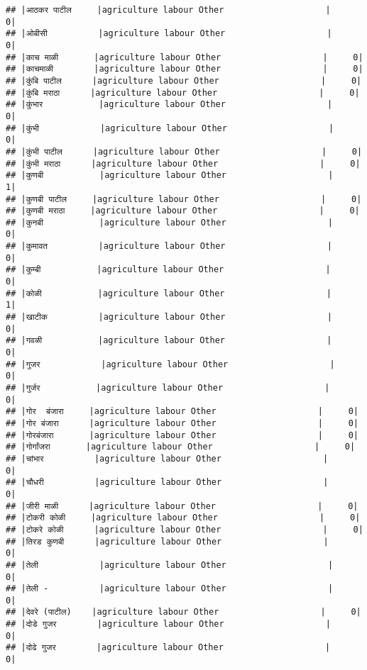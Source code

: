 \documentclass[
]{article}
\begin{document}
\begin{verbatim}
## |आठकर पाटील     |agriculture labour Other                    |     0|
## |ओबीसी          |agriculture labour Other                    |     0|
## |काच माळी       |agriculture labour Other                    |     0|
## |काचमाळी        |agriculture labour Other                    |     0|
## |कुंबि पाटील      |agriculture labour Other                    |     0|
## |कुंबि मराठा      |agriculture labour Other                    |     0|
## |कुंभार           |agriculture labour Other                    |     0|
## |कुंभी            |agriculture labour Other                    |     0|
## |कुंभी पाटील      |agriculture labour Other                    |     0|
## |कुंभी मराठा      |agriculture labour Other                    |     0|
## |कुणबी           |agriculture labour Other                    |     1|
## |कुणबी पाटील     |agriculture labour Other                    |     0|
## |कुणबी मराठा     |agriculture labour Other                    |     0|
## |कुनबी           |agriculture labour Other                    |     0|
## |कुमावत          |agriculture labour Other                    |     0|
## |कुम्बी           |agriculture labour Other                    |     0|
## |कोळी           |agriculture labour Other                    |     1|
## |खाटीक          |agriculture labour Other                    |     0|
## |गवळी           |agriculture labour Other                    |     0|
## |गुजर            |agriculture labour Other                    |     0|
## |गुर्जर           |agriculture labour Other                    |     0|
## |गोर  बंजारा     |agriculture labour Other                    |     0|
## |गोर बंजारा      |agriculture labour Other                    |     0|
## |गोरबंजारा       |agriculture labour Other                    |     0|
## |गोर्गांजरा       |agriculture labour Other                    |     0|
## |चांभार          |agriculture labour Other                    |     0|
## |चौधरी          |agriculture labour Other                    |     0|
## |जीरी माळी      |agriculture labour Other                    |     0|
## |टोकरी कोळी     |agriculture labour Other                    |     0|
## |टोकरे कोळी      |agriculture labour Other                    |     0|
## |तिरड कुणबी      |agriculture labour Other                    |     0|
## |तेली            |agriculture labour Other                    |     0|
## |तेली -          |agriculture labour Other                    |     0|
## |देवरे (पाटील)    |agriculture labour Other                    |     0|
## |दोडे गुजर        |agriculture labour Other                    |     0|
## |दोढे गुजर        |agriculture labour Other                    |     0|

\end{verbatim}
\end{document}
